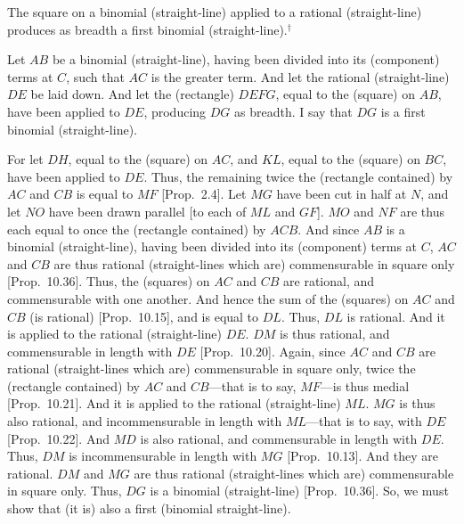 The square on a binomial (straight-line) applied to a rational (straight-line) produces as breadth a first binomial (straight-line).$^\dag$

\epsfysize=1.5in
\centerline{}

Let $AB$ be a binomial (straight-line), having been divided into its
(component) terms at $C$, such that $AC$ is the greater term. And let the
rational (straight-line) $DE$ be laid down. And let the (rectangle)
$DEFG$, equal to the (square) on $AB$, have been applied to $DE$,
producing $DG$ as breadth. I say that $DG$ is a first binomial (straight-line).

For let $DH$, equal to the (square) on $AC$,  and $KL$, equal to the
(square) on $BC$, have been applied to $DE$. Thus, the remaining twice
the (rectangle contained) by $AC$ and $CB$ is equal to $MF$ [Prop.~2.4].  Let $MG$ have been cut in half
at $N$, and let $NO$ have been drawn parallel [to each of $ML$ and
$GF$]. $MO$ and $NF$ are thus each equal to once the (rectangle contained)
by $ACB$. And since $AB$ is a binomial (straight-line), having been divided into its (component) terms at $C$,  $AC$ and $CB$ are thus rational (straight-lines which are) commensurable in square only [Prop.~10.36]. Thus, the (squares) on $AC$ and $CB$ are rational, and commensurable with one another.  And hence the
sum of the (squares) on $AC$ and $CB$ (is rational) [Prop.~10.15], and is equal to $DL$. Thus, $DL$
is rational. And it is applied to the rational (straight-line) $DE$. $DM$
is thus rational, and commensurable in length with $DE$ [Prop.~10.20]. Again, since $AC$ and $CB$
are rational (straight-lines which are) commensurable in square only, twice the (rectangle contained) by $AC$ and $CB$---that is to say, $MF$---is thus medial [Prop.~10.21]. And it is applied to the
rational (straight-line) $ML$. $MG$ is thus also rational, and incommensurable in length with $ML$---that is to say, with $DE$
[Prop.~10.22].  And $MD$ is also rational, and
commensurable in length with $DE$. Thus, $DM$ is  incommensurable in length with $MG$ [Prop.~10.13]. And
they are rational. $DM$ and $MG$ are thus rational (straight-lines which
are) commensurable in square only. Thus, $DG$ is a binomial (straight-line)
[Prop.~10.36]. So, we must show that (it is)
also a first (binomial straight-line).

